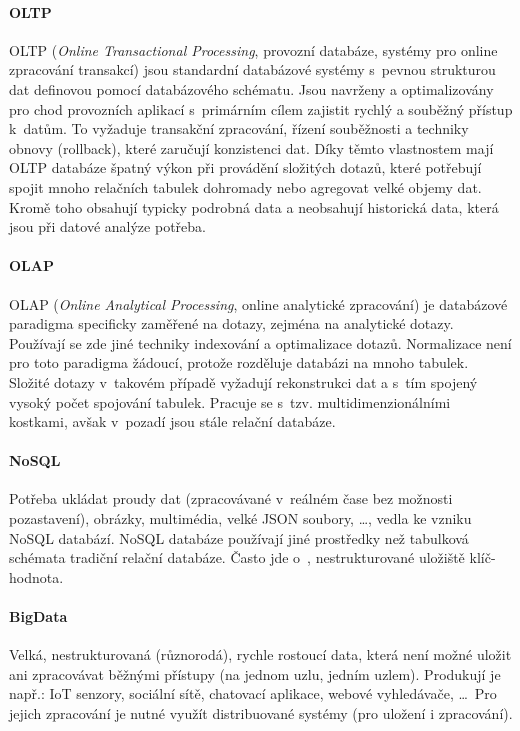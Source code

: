 \paragraph*{OLTP} OLTP (\textit{Online Transactional Processing}, provozní databáze, systémy pro online zpracování transakcí) jsou standardní databázové systémy s~pevnou strukturou dat definovou pomocí databázového schématu. Jsou navrženy a optimalizovány pro chod provozních aplikací s~primárním cílem zajistit rychlý a souběžný přístup k~datům. To vyžaduje transakční zpracování, řízení souběžnosti a techniky obnovy (rollback), které zaručují konzistenci dat. Díky těmto vlastnostem mají OLTP databáze špatný výkon při provádění složitých dotazů, které potřebují spojit mnoho relačních tabulek dohromady nebo agregovat velké objemy dat. Kromě toho obsahují typicky podrobná data a neobsahují historická data, která jsou při datové analýze potřeba.

\paragraph*{OLAP} OLAP (\textit{Online Analytical Processing}, online analytické zpracování) je databázové paradigma specificky zaměřené na dotazy, zejména na analytické dotazy. Používají se zde jiné techniky indexování a optimalizace dotazů. Normalizace není pro toto paradigma žádoucí, protože rozděluje databázi na mnoho tabulek. Složité dotazy v~takovém případě vyžadují rekonstrukci dat a s~tím spojený vysoký počet spojování tabulek. Pracuje se s~tzv. multidimenzionálními kostkami, avšak v~pozadí jsou stále relační databáze.

\paragraph*{NoSQL} Potřeba ukládat proudy dat (zpracovávané v~reálném čase bez možnosti pozastavení), obrázky, multimédia, velké JSON soubory, \dots, vedla ke vzniku NoSQL databází. NoSQL databáze používají jiné prostředky než tabulková schémata tradiční relační databáze. Často jde o~, nestrukturované uložiště klíč-hodnota.

\paragraph*{BigData} Velká, nestrukturovaná (různorodá), rychle rostoucí data, která není možné uložit ani zpracovávat běžnými přístupy (na jednom uzlu, jedním uzlem). Produkují je např.: IoT senzory, sociální sítě, chatovací aplikace, webové vyhledávače, \dots \, Pro jejich zpracování je nutné využít distribuované systémy (pro uložení i zpracování).

